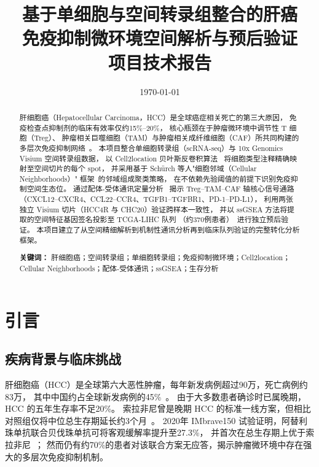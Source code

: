 \documentclass[12pt, a4paper]{ctexart}
\title{
    \vspace{-1cm}
    \textbf{基于单细胞与空间转录组整合的肝癌\\
    免疫抑制微环境空间解析与预后验证}\\[0.5em]
    \large 项目技术报告
}
\author{}
\date{\today}
\begin{document}
\maketitle
\thispagestyle{empty}

\begin{abstract}
肝细胞癌（Hepatocellular Carcinoma，HCC）是全球癌症相关死亡的第三大原因，
免疫检查点抑制剂的临床有效率仅约15\%--20\%，
核心瓶颈在于肿瘤微环境中调节性 T 细胞（Treg）、
肿瘤相关巨噬细胞（TAM）与肿瘤相关成纤维细胞（CAF）所共同构建的多层次免疫抑制网络~\citep{llovet2021hepatocellular,finn2020atezolizumab}。
本项目整合单细胞转录组（scRNA-seq）与 10x Genomics Visium 空间转录组数据，
以 Cell2location 贝叶斯反卷积算法~\citep{kleshchevnikov2022cell2location}
将细胞类型注释精确映射至空间切片的每个 spot，
并采用基于 Schürch 等人"细胞邻域（Cellular Neighborhoods）"
框架~\citep{schurch2020coordinated}的邻域组成聚类策略，
在不依赖先验阈值的前提下识别免疫抑制空间生态位。
通过配体-受体通讯定量分析~\citep{efremova2020cellphonedb}
揭示 Treg--TAM--CAF 轴核心信号通路（CXCL12--CXCR4、CCL22--CCR4、TGFB1--TGFBR1、PD-1--PD-L1），
利用两张独立 Visium 切片（HCC4R 与 CHC20）验证跨样本一致性，
并以 ssGSEA 方法将提取的空间特征基因签名投影至 TCGA-LIHC 队列
（约370例患者）~\citep{tomczak2015cancer}进行独立预后验证。
本项目建立了从空间精细解析到机制性通讯分析再到临床队列验证的完整转化分析框架。

\noindent\textbf{关键词：}
肝细胞癌；空间转录组；单细胞转录组；免疫抑制微环境；Cell2location；
Cellular Neighborhoods；配体-受体通讯；ssGSEA；生存分析
\end{abstract}

\newpage
\tableofcontents
\newpage


\section{引言}

\subsection{疾病背景与临床挑战}

肝细胞癌（HCC）是全球第六大恶性肿瘤，每年新发病例超过90万，死亡病例约83万，
其中中国约占全球新发病例的45\%~\citep{llovet2021hepatocellular,chen2021liver}。
由于大多数患者确诊时已属晚期，HCC 的五年生存率不足20\%。
索拉非尼曾是晚期 HCC 的标准一线方案，但相比对照组仅将中位总生存期延长约3个月~\citep{llovet2008sorafenib}。
2020年 IMbrave150 试验证明，阿替利珠单抗联合贝伐珠单抗可将客观缓解率提升至27.3\%，
并首次在总生存期上优于索拉非尼~\citep{finn2020atezolizumab}；
然而仍有约70\%的患者对该联合方案无应答，揭示肿瘤微环境中存在强大的多层次免疫抑制机制。
\end{document}
